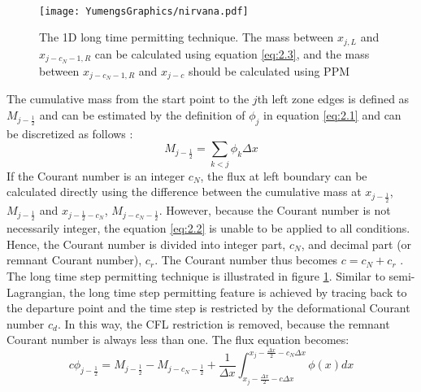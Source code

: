 \paragraph{} 
\begin{figure}
\centering
\texttt{[image: YumengsGraphics/nirvana.pdf]}
\caption{The 1D long time permitting technique. The mass between $x_{j,L}$ and $x_{j-c_N-1,R}$ can be calculated using equation \ref{eq:2.3}, and the mass between $x_{j-c_N-1,R}$ and $x_{j-c}$ should be calculated using PPM \label{fig:2.1}}
\end{figure}
The cumulative mass from the start point to the $j$th left zone edges is defined as $M_{j-\frac{1}{2}}$ and can be estimated by the definition of $\phi_j$ in equation \ref{eq:2.1} and can be discretized as follows \citep{Colella1984}:
\begin{equation} \label{eq:2.3}
M_{j-\frac{1}{2}} = \sum_{k < j} \phi_{k}\Delta x
\end{equation} 
If the Courant number is an integer $c_N$, the flux at left boundary can be calculated directly using the difference between the cumulative mass at $x_{j-\frac{1}{2}}$, $M_{j-\frac{1}{2}}$ and $x_{j-\frac{1}{2}-c_N}$, $M_{j-c_N-\frac{1}{2}}$. However, because the Courant number is not necessarily integer, the equation \ref{eq:2.2} is unable to be applied to all conditions. Hence, the Courant number is divided into integer part, $c_N$, and decimal part (or remnant Courant number), $c_r$. The Courant number thus becomes $c = c_N + c_r$ \citep{Leonard1995}. The long time step permitting technique is illustrated in figure \ref{fig:2.1}. Similar to semi-Lagrangian, the long time step permitting feature is achieved by tracing back to the departure point and the time step is restricted by the deformational Courant number $c_d$. In this way, the CFL restriction is removed, because the remnant Courant number is always less than one. The flux equation becomes:
\begin{equation} 
c\phi_{j-\frac{1}{2}} = M_{j-\frac{1}{2}} - M_{j-c_N-\frac{1}{2}} + \frac{1}{\Delta x} \int^{x_j-\frac {\Delta x}{2}-c_N\Delta x}_{x_j-\frac {\Delta x}{2}-c\Delta x} \phi (x)dx 
\end{equation} 
